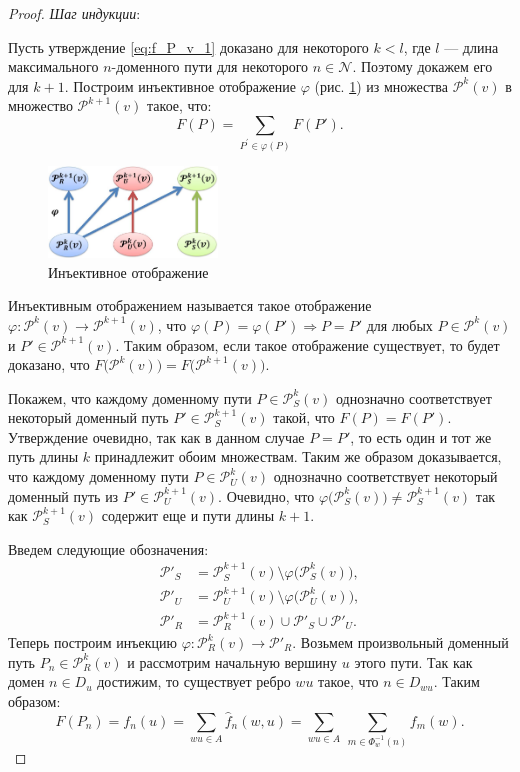 \documentclass[../thesis.tex]{subfiles}
\begin{document}
\begin{proof}
\textit{Шаг индукции}:

Пусть утверждение \eqref{eq:f_P_v_1} доказано для некоторого $k < l$, где $l$ --- длина максимального $n$-доменного пути для некоторого $n \in\mathcal{N}$. Поэтому докажем его для $k+1$.
Построим инъективное отображение $\varphi$ (рис. \ref{fig:relation}) из множества $\mathcal{P}^{k}(v)$ в множество $\mathcal{P}^{k+1}(v)$ такое, что:
\begin{equation}
    F(P) = \sum_{P^{'}\in \varphi(P)}{F(P')}.
\end{equation}

\begin{figure}
\centering
\includegraphics[width=0.4\textwidth]{figures/relation.jpg}
\caption{Инъективное отображение} \label{fig:relation}
\end{figure}

Инъективным отображением называется такое отображение $\varphi:\mathcal{P}^k(v) \rightarrow \mathcal{P}^{k+1}(v)$, что $\varphi(P)=\varphi(P')\Rightarrow P = P'$ для любых $P \in \mathcal{P}^k(v)$ и $P' \in \mathcal{P}^{k+1}(v)$.
Таким образом, если такое отображение существует, то будет доказано, что $F\big(\mathcal{P}^{k}(v)\big) = F\big(\mathcal{P}^{k+1}(v)\big)$.

Покажем, что каждому доменному пути $P\in \mathcal{P}^k_S(v)$ однозначно соответствует некоторый доменный путь $P'\in \mathcal{P}^{k+1}_S(v)$ такой, что $F(P) = F(P')$.
Утверждение очевидно, так как в данном случае $P = P'$, то есть один и тот же путь длины $k$ принадлежит обоим множествам.
Таким же образом доказывается, что каждому доменному пути $P\in \mathcal{P}^k_U(v)$ однозначно соответствует некоторый доменный путь из $P'\in \mathcal{P}^{k+1}_U(v)$.
Очевидно, что $\varphi\big(\mathcal{P}^k_S(v)\big) \neq \mathcal{P}^{k+1}_S(v)$ так как $\mathcal{P}^{k+1}_S(v)$ содержит еще и пути длины $k+1$.

Введем следующие обозначения:
\begin{align}
    \mathcal{P}'_S &= \mathcal{P}^{k+1}_S(v) \setminus \varphi\big( \mathcal{P}^{k}_S(v) \big), \\
    \mathcal{P}'_U &= \mathcal{P}^{k+1}_U(v) \setminus \varphi\big( \mathcal{P}^{k}_U(v) \big), \\
    \mathcal{P}'_R &= \mathcal{P}^{k+1}_R(v) \cup \mathcal{P}'_S \cup \mathcal{P}'_U.
\end{align}
Теперь построим инъекцию $\varphi: \mathcal{P}^{k}_R(v) \rightarrow \mathcal{P}'_R$.
Возьмем произвольный доменный путь $P_n\in \mathcal{P}^{k}_R(v)$ и рассмотрим начальную вершину $u$ этого пути.
Так как домен $n\in D_u$ достижим, то существует ребро $wu$ такое, что $n\in D_{wu}$.
Таким образом:
\begin{equation}
    F(P_n) = f_n(u) = \sum_{wu\in A}{\hat{f}_n(w,u)} = \sum_{wu\in A}{\ \sum_{m\in \Phi^{-1}_w(n)}{f_m(w)} }.
\end{equation}


\end{proof}
\end{document}
